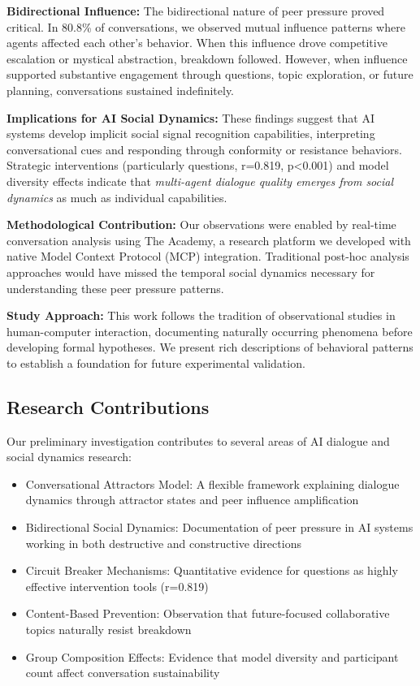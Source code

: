 \documentclass[11pt,letterpaper]{article}
\newcommand{\theacademy}{The Academy}
\newcommand{\exponedataBidirectionalPercentage}{80.8\%}
\newcommand{\exponedataQuestionCorrelation}{0.819}
\newcommand{\exponedataQuestionPValue}{p<0.001}
\begin{document}
\textbf{Bidirectional Influence:} The bidirectional nature of peer pressure proved critical. In \exponedataBidirectionalPercentage{} of conversations, we observed mutual influence patterns where agents affected each other's behavior. When this influence drove competitive escalation or mystical abstraction, breakdown followed. However, when influence supported substantive engagement through questions, topic exploration, or future planning, conversations sustained indefinitely.

\textbf{Implications for AI Social Dynamics:} These findings suggest that AI systems develop implicit social signal recognition capabilities, interpreting conversational cues and responding through conformity or resistance behaviors. Strategic interventions (particularly questions, r=\exponedataQuestionCorrelation{}, \exponedataQuestionPValue{}) and model diversity effects indicate that \textit{multi-agent dialogue quality emerges from social dynamics} as much as individual capabilities.

\textbf{Methodological Contribution:} Our observations were enabled by real-time conversation analysis using \theacademy{}, a research platform we developed with native Model Context Protocol (MCP) integration. Traditional post-hoc analysis approaches would have missed the temporal social dynamics necessary for understanding these peer pressure patterns.

\textbf{Study Approach:} This work follows the tradition of observational studies in human-computer interaction, documenting naturally occurring phenomena before developing formal hypotheses. We present rich descriptions of behavioral patterns to establish a foundation for future experimental validation.

\subsection{Research Contributions}

Our preliminary investigation contributes to several areas of AI dialogue and social dynamics research:

\begin{itemize}
    \item Conversational Attractors Model: A flexible framework explaining dialogue dynamics through attractor states and peer influence amplification
    \item Bidirectional Social Dynamics: Documentation of peer pressure in AI systems working in both destructive and constructive directions
    \item Circuit Breaker Mechanisms: Quantitative evidence for questions as highly effective intervention tools (r=\exponedataQuestionCorrelation{})
    \item Content-Based Prevention: Observation that future-focused collaborative topics naturally resist breakdown
    \item Group Composition Effects: Evidence that model diversity and participant count affect conversation sustainability
\end{itemize}
\end{document}
